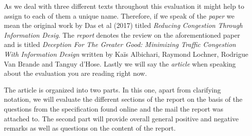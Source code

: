 \documentclass[../review.tex]{subfiles}
\begin{document}
As we deal with three different texts throughout this evaluation it might help to assign to each of them a unique name. Therefore, if we speak of the  \textit{paper} we mean the original work by Das et al (2017) titled \textit{Reducing Congestion Through Information Desig}. The \textit{report} denotes the review on the aforementioned paper and is titled \textit{Deception For The Greater Good: Minimizing Traffic Congestion With Information Design} written by Ka\"{i}s Albichari, Raymond Lochner, Rodrigue Van Brande and Tanguy d'Hose. Lastly we will say the \textit{article} when speaking about the evaluation you are reading right now.

The article is organized into two parts. In this one, apart from clarifying notation, we will evaluate the different sections of the report on the basis of the questions from the specification found online and the mail the report was attached to. The second part will provide overall general positive and negative remarks as well as questions on the content of the report.
\end{document}
